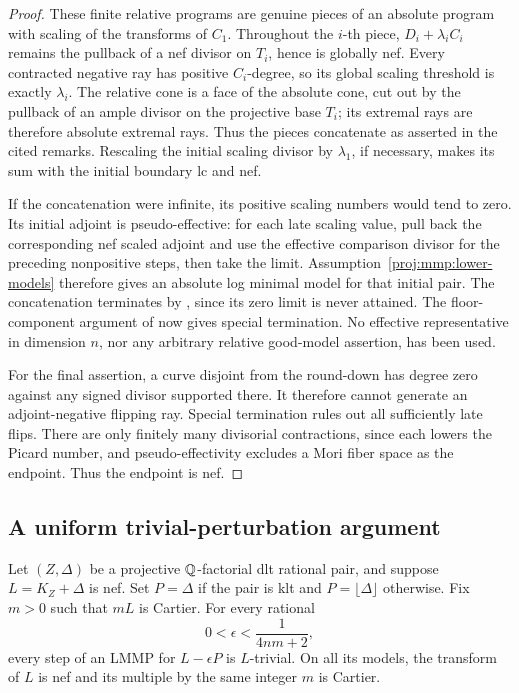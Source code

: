 \begin{proof}
These finite relative programs are genuine pieces of an absolute
program with scaling of the transforms of \(C_1\).
Throughout the \(i\)-th piece, \(D_i+\lambda_i C_i\) remains
the pullback of a nef divisor on \(T_i\), hence is globally nef.
Every contracted negative ray has positive \(C_i\)-degree,
so its global scaling threshold is exactly \(\lambda_i\).
The relative cone is a face of the absolute cone, cut out by
the pullback of an ample divisor on the projective base \(T_i\);
its extremal rays are therefore absolute extremal rays.
Thus the pieces concatenate as asserted in the cited remarks.
Rescaling the initial scaling divisor by \(\lambda_1\), if
necessary, makes its sum with the initial boundary lc and nef.

If the concatenation were infinite, its positive scaling numbers
would tend to zero. Its initial adjoint is pseudo-effective:
for each late scaling value, pull back the corresponding nef
scaled adjoint and use the effective comparison divisor for
the preceding nonpositive steps, then take the limit.
Assumption~\ref{proj:mmp:lower-models} therefore gives an absolute
log minimal model for that initial pair. The concatenation
terminates by \cite[Theorem~1.9(iii)]{Proj-Birkar2012Special}, since
its zero limit is never attained. The floor-component argument
of \cite[Lemma~3.6]{Proj-Birkar2010} now gives special termination.
No effective representative in dimension \(n\), nor any
arbitrary relative good-model assertion, has been used.

For the final assertion, a curve disjoint from the round-down
has degree zero against any signed divisor supported there.
It therefore cannot generate an adjoint-negative flipping ray.
Special termination rules out all sufficiently late flips.
There are only finitely many divisorial contractions, since
each lowers the Picard number, and pseudo-effectivity excludes
a Mori fiber space as the endpoint. Thus the endpoint is nef.
\end{proof}

\subsection{A uniform trivial-perturbation argument}

\begin{lemma}\label{proj:mmp:trivial-perturbation}
Let \((Z,\Delta)\) be a projective \(\mathbb{Q}\)-factorial dlt rational
pair, and suppose \(L=K_Z+\Delta\) is nef.
Set \(P=\Delta\) if the pair is klt and
\(P=\lfloor\Delta\rfloor\) otherwise.
Fix \(m>0\) such that \(mL\) is Cartier.
For every rational
\[
 0<\epsilon<\frac{1}{4nm+2},
\]
every step of an LMMP for \(L-\epsilon P\) is \(L\)-trivial.
On all its models, the transform of \(L\) is nef and its
multiple by the same integer \(m\) is Cartier.
\end{lemma}

